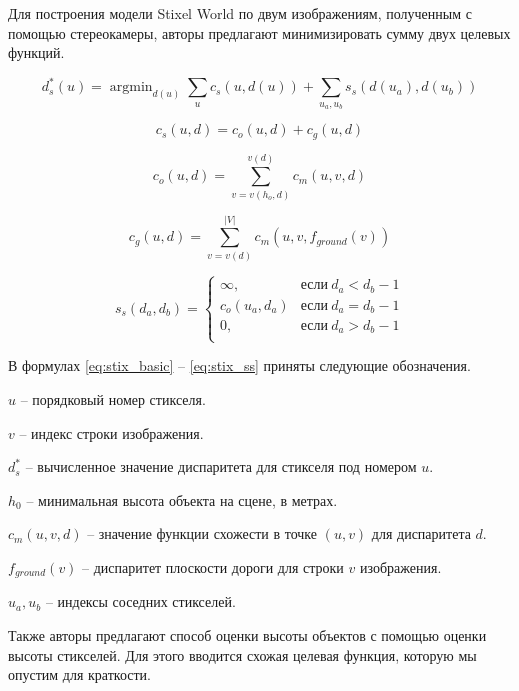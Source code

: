\documentclass[aps,%
14pt,%
final,%
oneside,
onecolumn,%
musixtex, %
superscriptaddress,%
centertags]{extarticle} %
\DeclareMathOperator*{\argmin}{argmin}
\begin{document}
Для построения модели Stixel World по двум изображениям, полученным с помощью стереокамеры, авторы предлагают минимизировать сумму двух целевых функций.

\begin{equation}\label{eq:stix_basic}
d^*_s(u) = \argmin_{d(u)}\sum_u c_s(u, d(u)) + \sum_{u_a, u_b} s_s(d(u_a), d(u_b))
\end{equation}

\begin{equation}
c_s(u, d) = c_o(u, d) + c_g(u, d)
\end{equation}

\begin{equation}\label{eq:stix_co}
c_o(u, d) = \sum_{v=v(h_o, d)}^{v(d)} c_m(u, v, d)
\end{equation}

\begin{equation}\label{eq:stix_cg}
c_g(u, d) = \sum_{v=v(d)}^{|V|} c_m(u, v, f_{ground}(v))
\end{equation}

\begin{equation}\label{eq:stix_ss}
s_s(d_a, d_b)=
\begin{cases}
  \infty, & \text{если}\ d_a < d_b - 1 \\
  c_o(u_a, d_a) & \text{если}\ d_a = d_b - 1 \\
  0, & \text{если}\ d_a > d_b - 1 \\
\end{cases}
\end{equation}

В формулах \ref{eq:stix_basic} -- \ref{eq:stix_ss} приняты следующие обозначения.

$u$ -- порядковый номер стикселя.

$v$ -- индекс строки изображения.

$d^*_s$ -- вычисленное значение диспаритета для стикселя под номером $u$.

$h_0$ -- минимальная высота объекта на сцене, в метрах.

$c_m(u, v, d)$ -- значение функции схожести в точке $(u, v)$ для диспаритета $d$.

$f_{ground}(v)$ -- диспаритет плоскости дороги для строки $v$ изображения.

$u_a, u_b$ -- индексы соседних стикселей.

Также авторы предлагают способ оценки высоты объектов с помощью оценки высоты стикселей. Для этого вводится схожая целевая функция, которую мы опустим для краткости.
\end{document}
